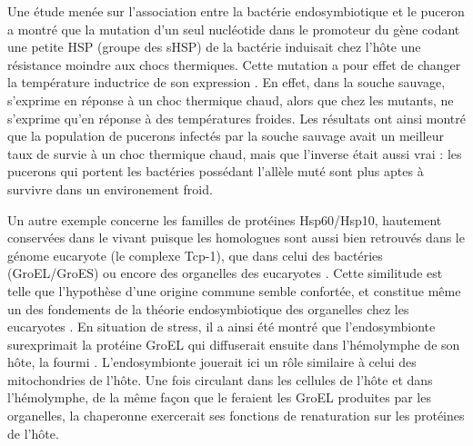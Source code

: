 Une étude menée sur l'association entre la bactérie endosymbiotique  et le puceron  a montré que la mutation d'un seul nucléotide dans le promoteur du gène  codant une petite HSP (groupe des sHSP) de la bactérie induisait chez l'hôte une résistance moindre aux chocs thermiques.
Cette mutation a pour effet de changer la température inductrice de son expression \cite{dunbar2007}.
En effet, dans la souche sauvage,  s'exprime en réponse à un choc thermique chaud, alors que chez les mutants,  ne s'exprime qu'en réponse à des températures froides.
Les résultats ont ainsi montré que la population de pucerons infectés par la souche sauvage avait un meilleur taux de survie à un choc thermique chaud, mais que l'inverse était aussi vrai : les pucerons qui portent les bactéries possédant l'allèle muté sont plus aptes à survivre dans un environement froid.

Un autre exemple concerne les familles de protéines Hsp60/Hsp10, hautement conservées dans le vivant puisque les homologues sont aussi bien retrouvés dans le génome eucaryote (le complexe Tcp-1), que dans celui des bactéries (GroEL/GroES) ou encore des organelles des eucaryotes \cite{gupta1995}.
Cette similitude est telle que l'hypothèse d'une origine commune semble confortée, et constitue même un des fondements de la théorie endosymbiotique des organelles chez les eucaryotes \cite{gupta1995}.
En situation de stress, il a ainsi été montré que l'endosymbionte  surexprimait la protéine GroEL qui diffuserait ensuite dans l'hémolymphe de son hôte, la fourmi  \cite{stoll2009, feldhaar2011}.
L'endosymbionte jouerait ici un rôle similaire à celui des mitochondries de l'hôte.
Une fois circulant dans les cellules de l'hôte et dans l'hémolymphe, de la même façon que le feraient les GroEL produites par les organelles, la chaperonne exercerait ses fonctions de renaturation sur les protéines de l'hôte.

